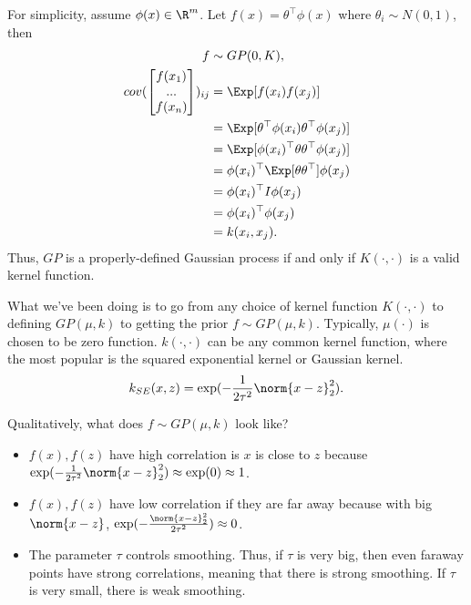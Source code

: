 \begin{enumerate}
	For simplicity, assume $\phi(x) \in \R^m$. 
	Let $f(x) = \theta^\top \phi(x)$ where $\theta_i \sim N(0, 1)$, then 
	\begin{equation*} \label{eq1}
		\begin{split}
			f &\sim GP(0, K), \\
			cov(
			\begin{bmatrix}
				f(x_1)\\
				...\\
				f(x_n)\\
			\end{bmatrix}
			)_{ij} & = \Exp[f(x_i) f(x_j)]\\
			& = \Exp[\theta^\top \phi(x_i) \theta^\top \phi(x_j)] \\
			& = \Exp[\phi(x_i)^\top \theta \theta^\top \phi(x_j)] \\
			& = \phi(x_i)^\top \Exp[\theta \theta^\top] \phi(x_j) \\
			& = \phi(x_i)^\top I \phi(x_j) \\
			& = \phi(x_i)^\top \phi(x_j)\\
			& = k(x_i, x_j).
		\end{split}
	\end{equation*}
	Thus, $GP$ is a properly-defined Gaussian process if and only if $K(\cdot, \cdot)$ is a valid kernel function. 
\end{enumerate}

What we've been doing is to go from any choice of kernel function $K(\cdot, \cdot)$ to defining $GP(\mu, k)$ to getting the prior $f \sim GP(\mu, k)$. Typically, $\mu(\cdot)$ is chosen to be zero function. $k(\cdot, \cdot)$ can be any common kernel function, where the most popular is the squared exponential kernel or Gaussian kernel.
\begin{equation*}\label{eu_eqn}
	k_{SE}(x, z) = \exp(-\frac{1}{2\tau^2}\norm{x - z}_2^2).
\end{equation*}

Qualitatively, what does $f \sim GP(\mu, k)$ look like? 
\begin{itemize}
	\item $f(x), f(z)$ have high correlation is $x$ is close to $z$ because $\exp(-\frac{1}{2\tau^2}\norm{x - z}_2^2) \approx \exp(0) \approx 1$.
	\item $f(x), f(z)$ have low correlation if they are far away because with big $\norm{x - z}$, $\exp(-\frac{\norm{x - z}_2^2}{2\tau^2}) \approx 0$.
	\item The parameter $\tau$ controls smoothing. Thus, if $\tau$ is very big, then even faraway points have strong correlations, meaning that there is strong smoothing. If $\tau$ is very small, there is weak smoothing.
\end{itemize}

